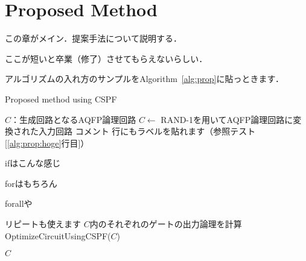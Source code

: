 \chapter{Proposed Method}
この章がメイン．提案手法について説明する．

ここが短いと卒業（修了）させてもらえないらしい．

アルゴリズムの入れ方のサンプルをAlgorithm~\ref{alg:prop}に貼っときます．
\begin{algorithm}[tbp]
 \caption{Proposed method using CSPF}\label{alg:prop}
 \begin{algorithmic}[1]
  \Require $C$：生成回路となるAQFP論理回路
  \State $C \gets$ RAND-1を用いてAQFP論理回路に変換された入力回路
  \State コメント 
  \State 行にもラベルを貼れます（参照テスト[\ref{alg:prop:hoge}行目]） \label{alg:prop:hoge}

  \State ifはこんな感じ
  \State \Return \True
  \State \Return \False
  \EndIf

  \State forはもちろん
  \EndFor

  \State forallや
  \EndFor

  \Repeat
  \State リピートも使えます
  \State $C$内のそれぞれのゲートの出力論理を計算
  \State OptimizeCircuitUsingCSPF($C$)

  \State \Return $C$
 \end{algorithmic}
\end{algorithm}
